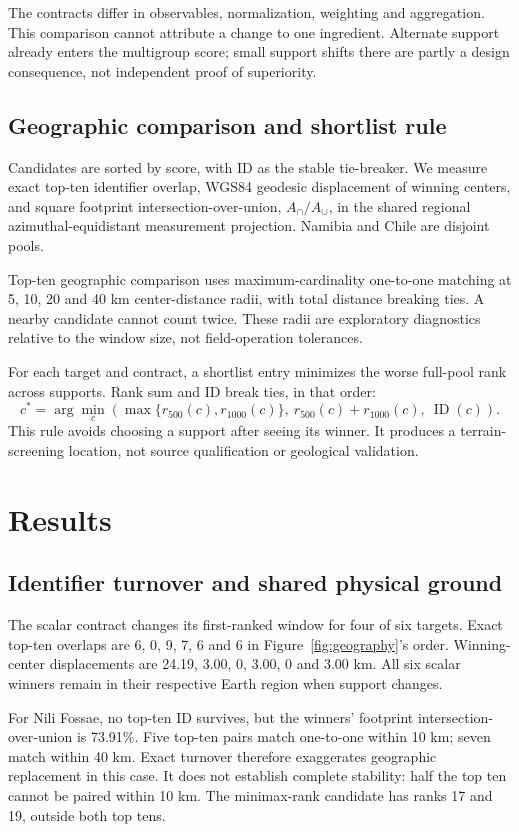 The contracts differ in observables, normalization, weighting and aggregation. This comparison cannot attribute a change to one ingredient. Alternate support already enters the multigroup score; small support shifts there are partly a design consequence, not independent proof of superiority.

\subsection{Geographic comparison and shortlist rule}
Candidates are sorted by score, with ID as the stable tie-breaker. We measure exact top-ten identifier overlap, WGS84 geodesic displacement of winning centers, and square footprint intersection-over-union, $A_{\cap}/A_{\cup}$, in the shared regional azimuthal-equidistant measurement projection. Namibia and Chile are disjoint pools.

Top-ten geographic comparison uses maximum-cardinality one-to-one matching at 5, 10, 20 and 40 km center-distance radii, with total distance breaking ties. A nearby candidate cannot count twice. These radii are exploratory diagnostics relative to the window size, not field-operation tolerances.

For each target and contract, a shortlist entry minimizes the worse full-pool rank across supports. Rank sum and ID break ties, in that order:
\begin{equation}
c^*=\arg\min_c\left(\max\{r_{500}(c),r_{1000}(c)\},\ r_{500}(c)+r_{1000}(c),\ \operatorname{ID}(c)\right).
\end{equation}
This rule avoids choosing a support after seeing its winner. It produces a terrain-screening location, not source qualification or geological validation.

\section{Results}
\subsection{Identifier turnover and shared physical ground}
The scalar contract changes its first-ranked window for four of six targets. Exact top-ten overlaps are 6, 0, 9, 7, 6 and 6 in Figure~\ref{fig:geography}'s order. Winning-center displacements are 24.19, 3.00, 0, 3.00, 0 and 3.00 km. All six scalar winners remain in their respective Earth region when support changes.

For Nili Fossae, no top-ten ID survives, but the winners' footprint intersection-over-union is 73.91\%. Five top-ten pairs match one-to-one within 10 km; seven match within 40 km. Exact turnover therefore exaggerates geographic replacement in this case. It does not establish complete stability: half the top ten cannot be paired within 10 km. The minimax-rank candidate has ranks 17 and 19, outside both top tens.

